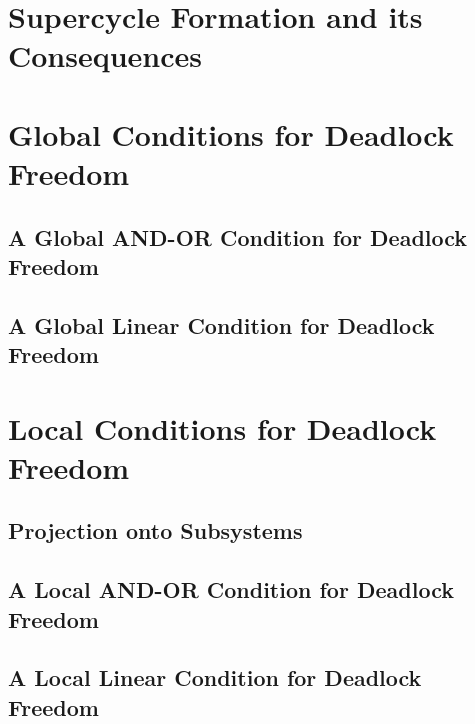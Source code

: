 \documentclass[11pt]{article}
\begin{document}
\section{Supercycle Formation and its Consequences}
\label{secn:scFormation}



\section{Global Conditions for Deadlock Freedom}
\label{s:global}

   \subsection{A Global AND-OR Condition for Deadlock Freedom}
   \label{s:global.ANDOR}
   

   \subsection{A Global Linear Condition for Deadlock Freedom}
   \label{s:globCondition}
   \label{s:global.Linear}
   


\section{Local Conditions for Deadlock Freedom}
\label{s:local}

   \label{s:local.preamble}
   

   \subsection{Projection onto Subsystems}
   \label{s:projection}
   

   \subsection{A Local AND-OR Condition for Deadlock Freedom}
   \label{s:ANDORcond}
   

   \subsection{A Local Linear Condition for Deadlock Freedom}
   \label{s:condition}
   
\end{document}
